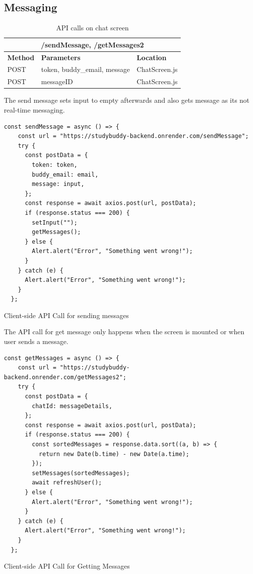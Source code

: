 \subsection{Messaging}
\begin{table}[H]
	\centering
	\begin{tabular}{ |p{}|p{}|p{}| }
		\hline
            \multicolumn{3}{|c|}{/sendMessage, /getMessages2} \\
            \hline
		\textbf{Method} & \textbf{Parameters} & \textbf{Location}\\
            \hline
		  POST & token, buddy\_email, message & ChatScreen.js\\
            \hline
		  POST & messageID & ChatScreen.js\\
            \hline
	\end{tabular}
	\caption{API calls on chat screen}
	\label{tab:chat}
\end{table}
The send message sets input to empty afterwards and also gets message as its not real-time messaging.
\begin{listing}[H]
\begin{verbatim} 
const sendMessage = async () => {
    const url = "https://studybuddy-backend.onrender.com/sendMessage";
    try {
      const postData = {
        token: token,
        buddy_email: email,
        message: input,
      };
      const response = await axios.post(url, postData);
      if (response.status === 200) {
        setInput("");
        getMessages();
      } else {
        Alert.alert("Error", "Something went wrong!");
      }
    } catch (e) {
      Alert.alert("Error", "Something went wrong!");
    }
  };
\end{verbatim}
\caption{Client-side API Call for sending messages}
\label{src:chat-send}
\end{listing}
The API call for get message only happens when the screen is mounted or when user sends a message.
\begin{listing}[H]
\begin{verbatim} 
const getMessages = async () => {
    const url = "https://studybuddy-backend.onrender.com/getMessages2";
    try {
      const postData = {
        chatId: messageDetails,
      };
      const response = await axios.post(url, postData);
      if (response.status === 200) {
        const sortedMessages = response.data.sort((a, b) => {
          return new Date(b.time) - new Date(a.time);
        });
        setMessages(sortedMessages);
        await refreshUser();
      } else {
        Alert.alert("Error", "Something went wrong!");
      }
    } catch (e) {
      Alert.alert("Error", "Something went wrong!");
    }
  };
\end{verbatim}
\caption{Client-side API Call for Getting Messages}
\label{src:chat-get}
\end{listing}
